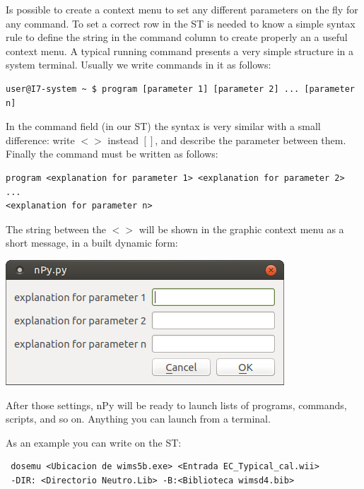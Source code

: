 \documentclass[a4paper,10pt]{article}
\begin{document}
Is possible to create a context menu to set any different parameters on the fly for any command. To set a correct row in the ST is needed to know a simple syntax rule to define the string in the command column to create properly an a useful context menu. A typical running command presents a very simple structure in a system terminal. Usually we write commands in it as follows:

\begin{verbatim}
user@I7-system ~ $ program [parameter 1] [parameter 2] ... [parameter n]
\end{verbatim}

In the command field (in our ST) the syntax is very similar with a small difference: write $< >$ instead $[]$, and describe the parameter between them. Finally the command must be written as follows:

\begin{verbatim}
program <explanation for parameter 1> <explanation for parameter 2> 
... 
<explanation for parameter n>
 \end{verbatim}

The string between the $< >$ will be shown in the graphic context menu as a short message, in a built dynamic form: 
\begin{center}
 \includegraphics[width=\textwidth]{img/contextMenuExampleString.png}
\end{center}

\bigskip 

After those settings, nPy will be ready to launch lists of programs, commands, scripts, and so on. Anything you can launch from a terminal.

\bigskip 

\noindent As an example you can write on the ST:
\begin{verbatim}
 dosemu <Ubicacion de wims5b.exe> <Entrada EC_Typical_cal.wii> 
 -DIR: <Directorio Neutro.Lib> -B:<Biblioteca wimsd4.bib>
 \end{verbatim}
 
\end{document}

